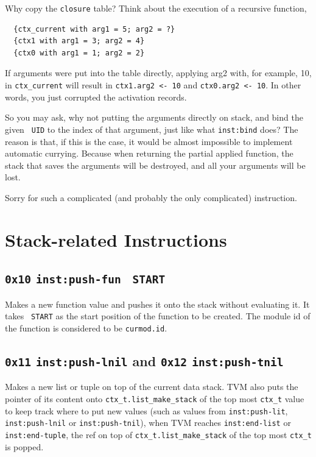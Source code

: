 \documentclass{report}
\newcommand{\mtilde}[1]{\textasciitilde}
\newcommand{\marg}[1]{\texttt{\mtilde ~#1}}
\newcommand{\inst}[1] {\texttt{inst:#1}}
\begin{document}
\begin{mdframed}[style=hint]
  Why copy the \texttt{closure} table? Think about the execution of a recursive function,

\begin{verbatim}
  {ctx_current with arg1 = 5; arg2 = ?}
  {ctx1 with arg1 = 3; arg2 = 4}
  {ctx0 with arg1 = 1; arg2 = 2}
\end{verbatim}

If arguments were put into the table directly, applying arg2 with, for example, 10, in \texttt{ctx\_current} will result in \texttt{ctx1.arg2 <- 10} and \texttt{ctx0.arg2 <- 10}. In other words, you just corrupted the activation records.

So you may ask, why not putting the arguments directly on stack, and bind the given \marg{UID} to the index of that argument, just like what \inst{bind} does? The reason is that, if this is the case, it would be almost impossible to implement automatic currying. Because when returning the partial applied function, the stack that saves the arguments will be destroyed, and all your arguments will be lost.
\end{mdframed}

Sorry for such a complicated (and probably the only complicated) instruction.

\section{Stack-related Instructions}

\subsection{\texttt{0x10} \inst{push-fun} \marg{START}}

Makes a new function value and pushes it onto the stack without evaluating it. It takes \marg{START} as the start position of the function to be created. The module id of the function is considered to be \texttt{curmod.id}.

\subsection{\texttt{0x11} \inst{push-lnil} and \texttt{0x12} \inst{push-tnil}}

Makes a new list or tuple on top of the current data stack. TVM also puts the pointer of its content onto \texttt{ctx\_t.list\_make\_stack} of the top most \texttt{ctx\_t} value to keep track where to put new values (such as values from \inst{push-lit}, \inst{push-lnil} or \inst{push-tnil}), when TVM reaches \inst{end-list} or \inst{end-tuple}, the ref on top of \texttt{ctx\_t.list\_make\_stack} of the top most \texttt{ctx\_t} is popped.
\end{document}
